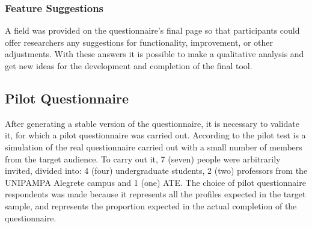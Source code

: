 \subsubsection{Feature Suggestions}

A field was provided on the questionnaire's final page so that participants could offer researchers any suggestions for functionality, improvement, or other adjustments.
With these answers it is possible to make a qualitative analysis and get new ideas for the development and completion of the final tool.


\subsection{Pilot Questionnaire}\label{sec:survey-pilot}

After generating a stable version of the questionnaire, it is necessary to validate it, for which a pilot questionnaire was carried out.
According to \textcite{kasunic2005designing} the pilot test is a simulation of the real questionnaire carried out with a small number of members from the target audience.
To carry out it, 7 (seven) people were arbitrarily invited, divided into: 4 (four) undergraduate students, 2 (two) professors from the \ac{UNIPAMPA} Alegrete campus and 1 (one) \ac{ATE}.
The choice of pilot questionnaire respondents was made because it represents all the profiles expected in the target sample, and represents the proportion expected in the actual completion of the questionnaire.

